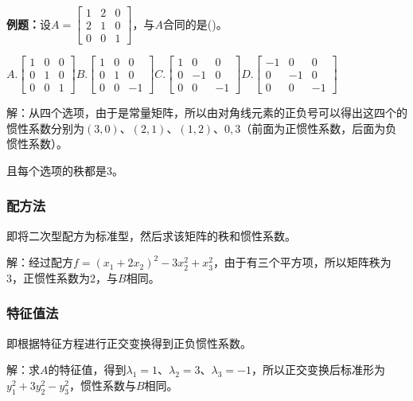 \documentclass[UTF8, 12pt]{ctexart}
\begin{document}
\textbf{例题：}设$A=\left[\begin{array}{ccc}
    1 & 2 & 0 \\
    2 & 1 & 0 \\
    0 & 0 & 1
\end{array}\right]$，与$A$合同的是()。

$A.\left[\begin{array}{ccc}
    1 & 0 & 0 \\
    0 & 1 & 0 \\
    0 & 0 & 1
\end{array}\right]$\;$B.\left[\begin{array}{ccc}
    1 & 0 & 0 \\
    0 & 1 & 0 \\
    0 & 0 & -1
\end{array}\right]$\;$C.\left[\begin{array}{ccc}
    1 & 0 & 0 \\
    0 & -1 & 0 \\
    0 & 0 & -1
\end{array}\right]$\;$D.\left[\begin{array}{ccc}
    -1 & 0 & 0 \\
    0 & -1 & 0 \\
    0 & 0 & -1
\end{array}\right]$ \medskip

解：从四个选项，由于是常量矩阵，所以由对角线元素的正负号可以得出这四个的惯性系数分别为$(3,0)$、$(2,1)$、$(1,2)$、$0,3$（前面为正惯性系数，后面为负惯性系数）。

且每个选项的秩都是3。

\subsubsection{配方法}

即将二次型配方为标准型，然后求该矩阵的秩和惯性系数。

解：经过配方$f=(x_1+2x_2)^2-3x_2^2+x_3^2$，由于有三个平方项，所以矩阵秩为3，正惯性系数为2，与$B$相同。

\subsubsection{特征值法}

即根据特征方程进行正交变换得到正负惯性系数。

解：求$A$的特征值，得到$\lambda_1=1$、$\lambda_2=3$、$\lambda_3=-1$，所以正交变换后标准形为$y_1^2+3y_2^2-y_3^2$，惯性系数与$B$相同。
\end{document}

